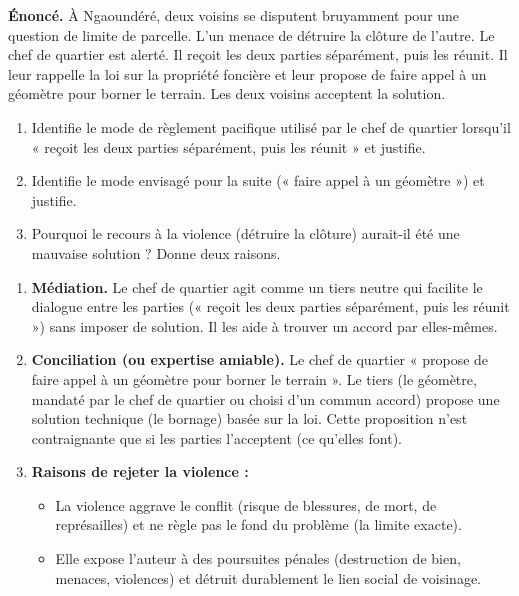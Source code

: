 \documentclass[11pt]{article}
\begin{document}
\begin{exercice}
\textbf{Énoncé.} À Ngaoundéré, deux voisins se disputent bruyamment pour une question de limite de parcelle. L'un menace de détruire la clôture de l'autre. Le chef de quartier est alerté. Il reçoit les deux parties séparément, puis les réunit. Il leur rappelle la loi sur la propriété foncière et leur propose de faire appel à un géomètre pour borner le terrain. Les deux voisins acceptent la solution.
\begin{enumerate}
\item Identifie le mode de règlement pacifique utilisé par le chef de quartier lorsqu'il « reçoit les deux parties séparément, puis les réunit » et justifie.
\item Identifie le mode envisagé pour la suite (« faire appel à un géomètre ») et justifie.
\item Pourquoi le recours à la violence (détruire la clôture) aurait-il été une mauvaise solution ? Donne deux raisons.
\end{enumerate}
\end{exercice}

\begin{corrige}
\begin{enumerate}
\item \textbf{Médiation.} Le chef de quartier agit comme un tiers neutre qui facilite le dialogue entre les parties (« reçoit les deux parties séparément, puis les réunit ») sans imposer de solution. Il les aide à trouver un accord par elles-mêmes.
\item \textbf{Conciliation (ou expertise amiable).} Le chef de quartier « propose de faire appel à un géomètre pour borner le terrain ». Le tiers (le géomètre, mandaté par le chef de quartier ou choisi d'un commun accord) propose une solution technique (le bornage) basée sur la loi. Cette proposition n'est contraignante que si les parties l'acceptent (ce qu'elles font).
\item \textbf{Raisons de rejeter la violence :}
\begin{itemize}
\item La violence aggrave le conflit (risque de blessures, de mort, de représailles) et ne règle pas le fond du problème (la limite exacte).
\item Elle expose l'auteur à des poursuites pénales (destruction de bien, menaces, violences) et détruit durablement le lien social de voisinage.
\end{itemize}
\end{enumerate}
\end{corrige}
\end{document}
